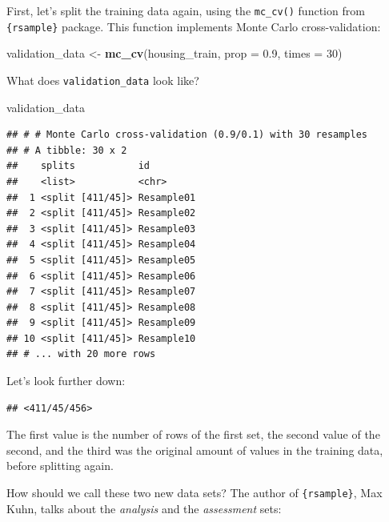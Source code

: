 \documentclass[]{gitbook}
\newenvironment{Shaded}{\begin{snugshade}}{\end{snugshade}}
\newcommand{\DataTypeTok}[1]{\textcolor[rgb]{0.13,0.29,0.53}{#1}}
\newcommand{\DecValTok}[1]{\textcolor[rgb]{0.00,0.00,0.81}{#1}}
\newcommand{\FloatTok}[1]{\textcolor[rgb]{0.00,0.00,0.81}{#1}}
\newcommand{\KeywordTok}[1]{\textcolor[rgb]{0.13,0.29,0.53}{\textbf{#1}}}
\newcommand{\NormalTok}[1]{#1}
\newcommand{\OperatorTok}[1]{\textcolor[rgb]{0.81,0.36,0.00}{\textbf{#1}}}
\newcommand{\StringTok}[1]{\textcolor[rgb]{0.31,0.60,0.02}{#1}}
\begin{document}
First, let's split the training data again, using the \texttt{mc\_cv()} function from \texttt{\{rsample\}} package.
This function implements Monte Carlo cross-validation:

\begin{Shaded}
\begin{Highlighting}[]
\NormalTok{validation_data <-}\StringTok{ }\KeywordTok{mc_cv}\NormalTok{(housing_train, }\DataTypeTok{prop =} \FloatTok{0.9}\NormalTok{, }\DataTypeTok{times =} \DecValTok{30}\NormalTok{)}
\end{Highlighting}
\end{Shaded}

What does \texttt{validation\_data} look like?

\begin{Shaded}
\begin{Highlighting}[]
\NormalTok{validation_data}
\end{Highlighting}
\end{Shaded}

\begin{verbatim}
## # # Monte Carlo cross-validation (0.9/0.1) with 30 resamples  
## # A tibble: 30 x 2
##    splits           id        
##    <list>           <chr>     
##  1 <split [411/45]> Resample01
##  2 <split [411/45]> Resample02
##  3 <split [411/45]> Resample03
##  4 <split [411/45]> Resample04
##  5 <split [411/45]> Resample05
##  6 <split [411/45]> Resample06
##  7 <split [411/45]> Resample07
##  8 <split [411/45]> Resample08
##  9 <split [411/45]> Resample09
## 10 <split [411/45]> Resample10
## # ... with 20 more rows
\end{verbatim}

Let's look further down:

\begin{Shaded}
\end{Shaded}

\begin{verbatim}
## <411/45/456>
\end{verbatim}

The first value is the number of rows of the first set, the second value of the second, and the third
was the original amount of values in the training data, before splitting again.

How should we call these two new data sets? The author of \texttt{\{rsample\}}, Max Kuhn, talks about
the \emph{analysis} and the \emph{assessment} sets:
\end{document}

